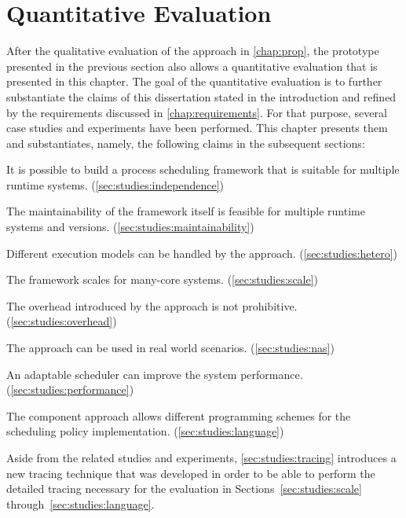 \chapter{Quantitative Evaluation}%
\label{chap:study}

After the qualitative evaluation of the \cobas{} approach in \cref{chap:prop}, the \cobas{} prototype presented in the previous section also allows a quantitative evaluation that is presented in this chapter. The goal of the quantitative evaluation is to further substantiate the claims of this dissertation stated in the introduction and refined by the requirements discussed in \cref{chap:requirements}. For that purpose, several case studies and experiments have been performed. This chapter presents them and substantiates, namely, the following claims in the subsequent sections:

\begin{itemize*}
	\item It is possible to build a process scheduling framework that is suitable for multiple runtime systems. (\cref{sec:studies:independence})
	\item The maintainability of the \cobas{} framework itself is feasible for multiple runtime systems and versions. (\cref{sec:studies:maintainability})
	\item Different execution models can be handled by the \cobas{} approach. (\cref{sec:studies:hetero})
	\item The \cobas{} framework scales for many-core systems. (\cref{sec:studies:scale})
	\item The overhead introduced by the \cobas{} approach is not prohibitive. (\cref{sec:studies:overhead})
	\item The \cobas{} approach can be used in real world scenarios. (\cref{sec:studies:nas})
	\item An adaptable scheduler can improve the system performance. (\cref{sec:studies:performance})
	\item The component approach allows different programming schemes for the scheduling policy implementation. (\cref{sec:studies:language})
\end{itemize*}

Aside from the \cobas{} related studies and experiments, \cref{sec:studies:tracing} introduces a new tracing technique that was developed in order to be able to perform the detailed tracing necessary for the evaluation in Sections~\ref{sec:studies:scale} through~\ref{sec:studies:language}.

